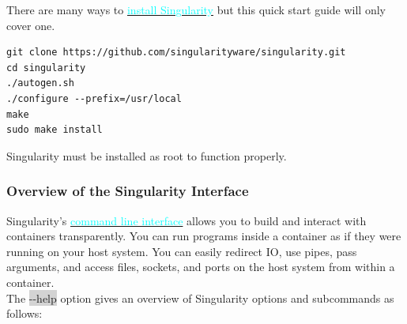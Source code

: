 \documentclass[a4paper]{article}
\begin{document}
There are many ways to \hyperref[sec:installation]{{\textcolor{cyan}{install Singularity}}} but this quick start guide will only cover one.
\\[0.1in]


\lstset{language=bash}          %
\lstset{basicstyle = \ttfamily,columns=fullflexible}

\begin{lstlisting}[frame=single]  
git clone https://github.com/singularityware/singularity.git
cd singularity
./autogen.sh
./configure --prefix=/usr/local
make
sudo make install
\end{lstlisting}

Singularity must be installed as root to function properly.

\subsubsection{Overview of the Singularity Interface}

Singularity’s \hyperref[sec:commandlineinterface]{{\textcolor{cyan}{command line interface}}} allows you to build and interact with containers transparently. You can run programs inside a container as if they were running on your host system. You can easily redirect IO, use pipes, pass arguments, and access files, sockets, and ports on the host system from within a container.\\

The \colorbox{lightgray}{-{}-help} option gives an overview of Singularity options and subcommands as follows:
\end{document}
